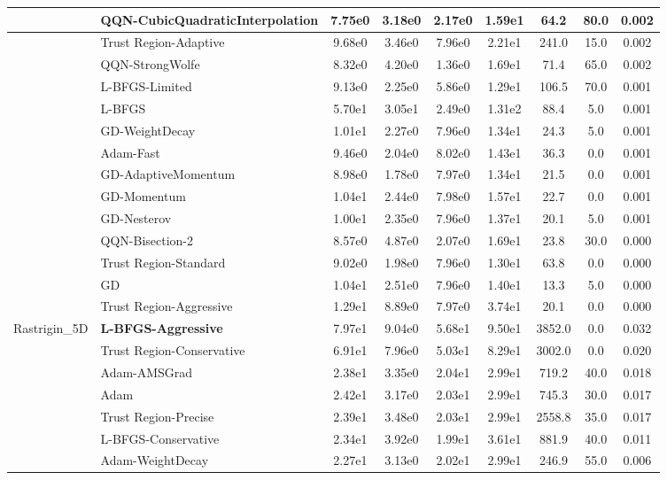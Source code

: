 \documentclass{article}
\begin{document}
\begin{longtable}{|l|l|c|c|c|c|c|c|c|}
\hline
 & QQN-CubicQuadraticInterpolation & 7.75e0 & 3.18e0 & 2.17e0 & 1.59e1 & 64.2 & 80.0 & 0.002 \\
\hline
 & Trust Region-Adaptive & 9.68e0 & 3.46e0 & 7.96e0 & 2.21e1 & 241.0 & 15.0 & 0.002 \\
\hline
 & QQN-StrongWolfe & 8.32e0 & 4.20e0 & 1.36e0 & 1.69e1 & 71.4 & 65.0 & 0.002 \\
\hline
 & L-BFGS-Limited & 9.13e0 & 2.25e0 & 5.86e0 & 1.29e1 & 106.5 & 70.0 & 0.001 \\
\hline
 & L-BFGS & 5.70e1 & 3.05e1 & 2.49e0 & 1.31e2 & 88.4 & 5.0 & 0.001 \\
\hline
 & GD-WeightDecay & 1.01e1 & 2.27e0 & 7.96e0 & 1.34e1 & 24.3 & 5.0 & 0.001 \\
\hline
 & Adam-Fast & 9.46e0 & 2.04e0 & 8.02e0 & 1.43e1 & 36.3 & 0.0 & 0.001 \\
\hline
 & GD-AdaptiveMomentum & 8.98e0 & 1.78e0 & 7.97e0 & 1.34e1 & 21.5 & 0.0 & 0.001 \\
\hline
 & GD-Momentum & 1.04e1 & 2.44e0 & 7.98e0 & 1.57e1 & 22.7 & 0.0 & 0.001 \\
\hline
 & GD-Nesterov & 1.00e1 & 2.35e0 & 7.96e0 & 1.37e1 & 20.1 & 5.0 & 0.001 \\
\hline
 & QQN-Bisection-2 & 8.57e0 & 4.87e0 & 2.07e0 & 1.69e1 & 23.8 & 30.0 & 0.000 \\
\hline
 & Trust Region-Standard & 9.02e0 & 1.98e0 & 7.96e0 & 1.30e1 & 63.8 & 0.0 & 0.000 \\
\hline
 & GD & 1.04e1 & 2.51e0 & 7.96e0 & 1.40e1 & 13.3 & 5.0 & 0.000 \\
\hline
 & Trust Region-Aggressive & 1.29e1 & 8.89e0 & 7.97e0 & 3.74e1 & 20.1 & 0.0 & 0.000 \\
Rastrigin\_5D & \textbf{L-BFGS-Aggressive} & 7.97e1 & 9.04e0 & 5.68e1 & 9.50e1 & 3852.0 & 0.0 & 0.032 \\
\hline
 & Trust Region-Conservative & 6.91e1 & 7.96e0 & 5.03e1 & 8.29e1 & 3002.0 & 0.0 & 0.020 \\
\hline
 & Adam-AMSGrad & 2.38e1 & 3.35e0 & 2.04e1 & 2.99e1 & 719.2 & 40.0 & 0.018 \\
\hline
 & Adam & 2.42e1 & 3.17e0 & 2.03e1 & 2.99e1 & 745.3 & 30.0 & 0.017 \\
\hline
 & Trust Region-Precise & 2.39e1 & 3.48e0 & 2.03e1 & 2.99e1 & 2558.8 & 35.0 & 0.017 \\
\hline
 & L-BFGS-Conservative & 2.34e1 & 3.92e0 & 1.99e1 & 3.61e1 & 881.9 & 40.0 & 0.011 \\
\hline
 & Adam-WeightDecay & 2.27e1 & 3.13e0 & 2.02e1 & 2.99e1 & 246.9 & 55.0 & 0.006 \\

\end{longtable}
\end{document}

